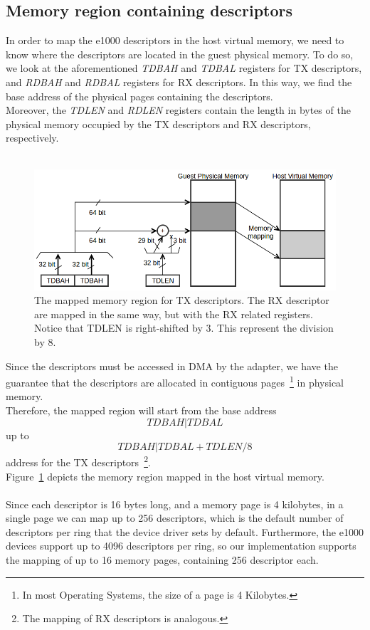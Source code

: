 \documentclass[a4paper, 12pt, titlepage]{report}
\begin{document}
\subsection{Memory region containing descriptors}
In order to map the e1000 descriptors in the host virtual memory, we need to know where the descriptors are located in the guest physical memory. To do so, we look at the aforementioned \textit{TDBAH} and \textit{TDBAL} registers for TX descriptors, and \textit{RDBAH} and \textit{RDBAL} registers for RX descriptors. In this way, we find the base address of the physical pages containing the descriptors.
\\
Moreover, the \textit{TDLEN} and \textit{RDLEN} registers contain the length in bytes of the physical memory occupied by the TX descriptors and RX descriptors, respectively. 
\\\\
\begin{figure}[!t]
	\centering
	\includegraphics[width=\textwidth]{img/phys_mem.png}
	\caption{The mapped memory region for TX descriptors. The RX descriptor are mapped in the same way, but with the RX related registers. Notice that TDLEN is right-shifted by 3. This represent the division by 8.}
	\label{img:memmap}
\end{figure}Since the descriptors must be accessed in DMA by the adapter, we have the guarantee that the descriptors are allocated in contiguous pages~\footnote{In most Operating Systems, the size of a page is 4 Kilobytes.} in physical memory.
\\
Therefore, the mapped region will start from the base address $$TDBAH|TDBAL$$ up to  $$TDBAH|TDBAL + TDLEN / 8$$ address for the TX descriptors~\footnote{The mapping of RX descriptors is analogous.}.
\\
Figure~\ref{img:memmap} depicts the memory region mapped in the host virtual memory.
\\
\\
Since each descriptor is 16 bytes long, and a memory page is 4 kilobytes, in a single page we can map up to 256 descriptors, which is the default number of descriptors per ring that the device driver sets by default.
Furthermore, the e1000 devices support up to 4096 descriptors per ring, so our implementation supports the mapping of up to 16 memory pages, containing 256 descriptor each.
\end{document}
